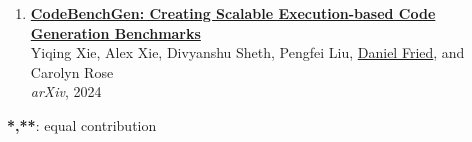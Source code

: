 \begin{enumerate}[leftmargin=-1mm,partopsep=0pt]
\item \href{https://arxiv.org/abs/2404.00566}{\textbf{CodeBenchGen: Creating Scalable Execution-based Code Generation Benchmarks}} \\
  Yiqing Xie, Alex Xie, Divyanshu Sheth, Pengfei Liu, \underline{Daniel Fried}, and Carolyn Rose\\
  \emph{arXiv}, 2024

\end{enumerate}

\textbf{*,**}: equal contribution
